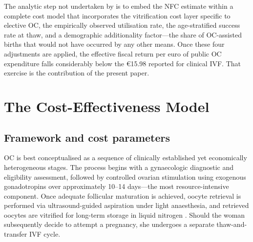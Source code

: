 \documentclass[12pt,a4paper]{article}
\begin{document}
The analytic step not undertaken by \citet{matorras2016} is to embed
the NFC estimate within a complete cost model that incorporates the
vitrification cost layer specific to elective OC, the empirically
observed utilisation rate, the age-stratified success rate at thaw, and
a demographic additionality factor---the share of OC-assisted births
that would not have occurred by any other means. Once these four
adjustments are applied, the effective fiscal return per euro of public
OC expenditure falls considerably below the \euro{}15.98 reported for
clinical IVF. That exercise is the contribution of the present paper.

\section{The Cost-Effectiveness Model}\label{sec:model}

\subsection{Framework and cost parameters}\label{sec:framework}

OC is best conceptualised as a sequence of clinically established yet
economically heterogeneous stages. The process begins with a
gynaecologic diagnostic and eligibility assessment, followed by
controlled ovarian stimulation using exogenous gonadotropins over
approximately 10--14 days---the most resource-intensive component.
Once adequate follicular maturation is achieved, oocyte retrieval is
performed via ultrasound-guided aspiration under light anaesthesia, and
retrieved oocytes are vitrified for long-term storage in liquid
nitrogen \citep{pai2021}. Should the woman subsequently decide to
attempt a pregnancy, she undergoes a separate thaw-and-transfer IVF
cycle.
\end{document}
